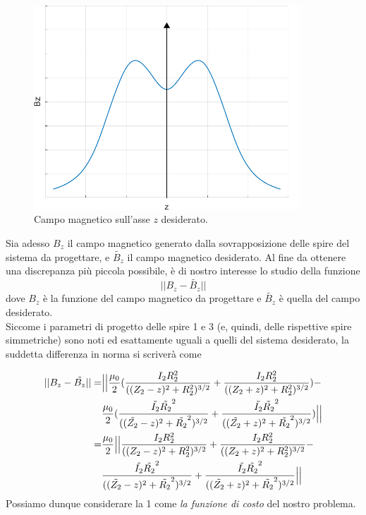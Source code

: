 \documentclass[a4paper, 11pt]{article}
\begin{document}
\begin{figure}[H]
	\centering
	\includegraphics[width=10cm]{assets/figure3}
	\caption{Campo magnetico sull'asse $z$ desiderato.}
\end{figure}
\noindent
Sia adesso $B_{z}$ il campo magnetico generato dalla sovrapposizione delle spire
del sistema da progettare, e $\tilde{B_{z}}$ il campo magnetico desiderato. Al
fine da ottenere una discrepanza più piccola possibile, è di nostro interesse lo
studio della funzione
\[||B_{z}-\tilde{B_{z}}||\] dove $B_{z}$ è la funzione del campo magnetico da
progettare e $\tilde{B_{z}}$ è quella del campo desiderato. \\
Siccome i parametri di progetto delle spire 1 e 3 (e, quindi, delle rispettive
spire simmetriche) sono noti ed esattamente uguali a quelli del sistema
desiderato, la suddetta differenza in norma si scriverà come

\begin{equation}
	\begin{split}
	||B_{z}-\tilde{B_{z}}||
		=& \Bigl|\Bigl|\frac{\mu_{0}}{2}(\frac{I_{2}R_{2}^{2}}{((Z_{2}-z)^{2}+R_{2}^{2})^{3/2}}+\frac{I_{2}R_{2}^{2}}{((Z_{2}+z)^{2}+R_{2}^{2})^{3/2}})- \\
		 & \frac{\mu_{0}}{2}(\frac{\tilde{I_{2}}\tilde{R_{2}}^{2}}{((\tilde{Z_{2}}-z)^{2}+\tilde{R_{2}}^{2})^{3/2}}+\frac{\tilde{I_{2}}\tilde{R_{2}}^{2}}{((\tilde{Z_{2}}+z)^{2}+\tilde{R_{2}}^{2})^{3/2}})\Bigr|\Bigr| \\
		=& \frac{\mu_{0}}{2}\Bigl|\Bigl|\frac{I_{2}R_{2}^{2}}{((Z_{2}-z)^{2}+R_{2}^{2})^{3/2}}+\frac{I_{2}R_{2}^{2}}{((Z_{2}+z)^{2}+R_{2}^{2})^{3/2}}- \\
		 & \frac{\tilde{I_{2}}\tilde{R_{2}}^{2}}{((\tilde{Z_{2}}-z)^{2}+\tilde{R_{2}}^{2})^{3/2}}+\frac{\tilde{I_{2}}\tilde{R_{2}}^{2}}{((\tilde{Z_{2}}+z)^{2}+\tilde{R_{2}}^{2})^{3/2}}\Bigr|\Bigr|
	\end{split} 
\end{equation}
\noindent
Possiamo dunque considerare la 1 come \emph{la funzione di costo} del nostro problema.
\end{document}
